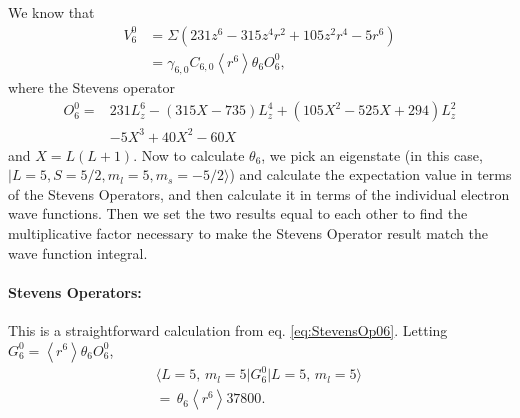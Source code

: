 \documentclass[twocolumn,english,prb]{revtex4-2}
\begin{document}
We know that 
\begin{equation}
\begin{aligned}
V_{6}^{0}&=\Sigma(231z^{6}-315z^{4}r^{2}+105z^{2}r^{4}-5r^{6}) \\
&=\gamma_{6,0}C_{6,0}\left\langle r^{6}\right\rangle \theta_{6}O_{6}^{0},
\end{aligned}\end{equation}
where the Stevens operator
\begin{equation}\begin{aligned}
O_{6}^{0}=&231L_{z}^{6}-(315X-735)L_{z}^{4}+(105X^{2}-525X+294)L_{z}^{2} \\
&-5X^{3}+40X^{2}-60X
\label{eq:StevensOp06}
\end{aligned}\end{equation}
and $X=L(L+1)$. Now to calculate $\theta_{6}$, we pick an eigenstate (in this case, $| L=5, S=5/2, m_l=5, m_s=-5/2 \rangle$) and calculate
the expectation value in terms of the Stevens Operators, and then
calculate it in terms of the individual electron wave functions. Then we set the two results equal to each other to find the multiplicative factor necessary to make the Stevens Operator result match the wave function integral.

\paragraph*{Stevens Operators:}
This is a straightforward calculation from eq. \ref{eq:StevensOp06}. Letting $G_{6}^{0}=\left\langle r^{6}\right\rangle \theta_{6}O_{6}^{0}$,
\begin{equation}\begin{aligned}
\langle L=5,\,m_{l}=5\rvert G_{6}^{0}\lvert L=5,\,m_{l}=5\rangle\, \\
=\,\theta_{6}\left\langle r^{6}\right\rangle 37800.
\label{eq:StevensOpCalc}
\end{aligned}\end{equation}
\end{document}
